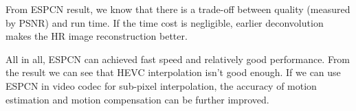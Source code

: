 \documentclass[12pt,journal,compsoc]{IEEEtran}
\begin{document}
From ESPCN result, we know that there is a trade-off between quality (measured by PSNR) and run time. If the time cost is negligible, earlier deconvolution makes the HR image reconstruction better. 

All in all, ESPCN can achieved fast speed and relatively good performance. From the result we can see that HEVC interpolation isn't good enough. If we can use ESPCN in video codec for sub-pixel interpolation, the accuracy of motion estimation and motion compensation can be further improved.

\ifCLASSOPTIONcaptionsoff
  \newpage
\fi




\end{document}
